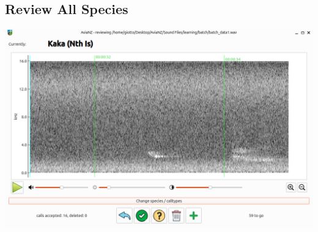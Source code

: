 \documentclass{article}
\begin{document}
\subsection{Review All Species\label{sec:batchAll}}
\begin{center}
	\includegraphics[width=.95\textwidth]{Figures/BatchReview3}
\end{center}
\end{document}
